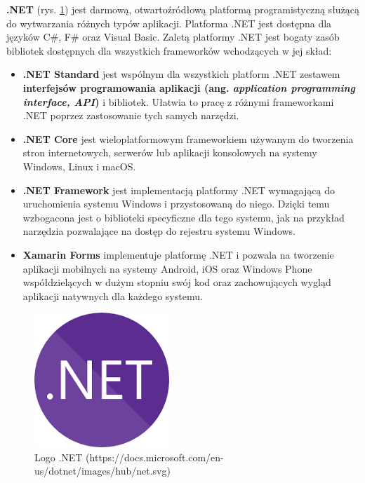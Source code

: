 \textbf{.NET} (rys. \ref{dotnet_logo}) jest darmową, otwartoźródłową platformą programistyczną służącą do wytwarzania różnych typów aplikacji. Platforma .NET jest dostępna dla języków C\#, F\# oraz Visual Basic. Zaletą platformy .NET jest bogaty zasób bibliotek dostępnych dla wszystkich frameworków wchodzących w jej skład:
\begin{itemize}
	\item\textbf{.NET Standard} jest wspólnym dla wszystkich platform .NET zestawem \textbf{interfejsów programowania aplikacji (ang. \textit{application programming interface, API})} i bibliotek. Ułatwia to pracę z różnymi frameworkami .NET poprzez zastosowanie tych samych narzędzi.
	\item\textbf{.NET Core} jest wieloplatformowym frameworkiem używanym do tworzenia stron internetowych, serwerów lub aplikacji konsolowych na systemy Windows, Linux i macOS.
	\item\textbf{.NET Framework} jest implementacją platformy .NET wymagającą do uruchomienia systemu Windows i przystosowaną do niego. Dzięki temu wzbogacona jest o biblioteki specyficzne dla tego systemu, jak na przykład narzędzia pozwalające na dostęp do rejestru systemu Windows.
	\item\textbf{Xamarin Forms} implementuje platformę .NET i pozwala na tworzenie aplikacji mobilnych na systemy Android, iOS oraz Windows Phone współdzielących w dużym stopniu swój kod oraz zachowujących wygląd aplikacji natywnych dla każdego systemu.\cite{microsoftdotnet}
\end{itemize}
\begin{figure}[!ht]
\begin{center}
	\includegraphics[width=2in]{img/logo/dotnet.png}
	\caption{Logo .NET (https://docs.microsoft.com/en-us/dotnet/images/hub/net.svg)}
	\label{dotnet_logo}
\end{center}
\end{figure}

